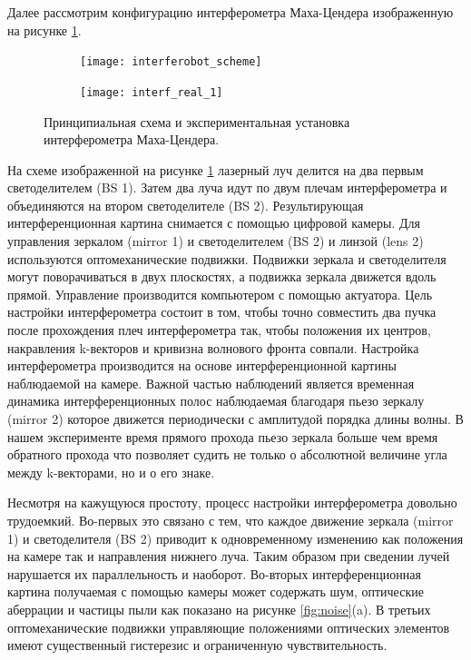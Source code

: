 Далее рассмотрим конфигурацию интерферометра Маха-Цендера изображенную на рисунке \ref{fig:interf_scheme_1}. 

\begin{figure}[ht]
    \centering
     \begin{subfigure}[b]{0.45\linewidth}
         \centering
         \texttt{[image: interferobot\_scheme]}
     \end{subfigure}
     \centering
     \begin{subfigure}[b]{0.45\linewidth}
         \centering
         \texttt{[image: interf\_real\_1]}
     \end{subfigure}
    \caption{
     Принципиальная схема и экспериментальная установка интерферометра Маха-Цендера. }
\label{fig:interf_scheme_1}
\end{figure}

На схеме изображенной на рисунке \ref{fig:interf_scheme_1} лазерный луч делится на два первым светоделителем (BS 1). Затем два луча идут по двум плечам интерферометра и объединяются на втором светоделителе (BS 2). Результирующая интерференционная картина снимается с помощью цифровой камеры. Для управления зеркалом (mirror 1) и светоделителем (BS 2) и линзой (lens 2) используются оптомеханические подвижки. Подвижки зеркала и светоделителя могут поворачиваться в двух плоскостях, а подвижка зеркала движется вдоль прямой. Управление производится компьютером с помощью актуатора. Цель настройки интерферометра состоит в том, чтобы точно совместить два пучка после прохождения плеч интерферометра так, чтобы положения их центров, накравления k-векторов и кривизна волнового фронта совпали. Настройка интерферометра производится на основе интерференционной картины наблюдаемой на камере. Важной частью наблюдений является временная динамика интерференционных полос наблюдаемая благодаря пьезо зеркалу (mirror 2) которое движется периодически с амплитудой порядка длины волны. В нашем эксперименте время прямого прохода пьезо зеркала больше чем время обратного прохода что позволяет судить не только о абсолютной величине угла между k-векторами, но и о его знаке. 

Несмотря на кажущуюся простоту, процесс настройки интерферометра довольно трудоемкий. Во-первых это связано с тем, что каждое движение зеркала  (mirror 1) и светоделителя (BS 2) приводит к одновременному изменению как положения на камере так и направления нижнего луча. Таким образом при сведении лучей нарушается их параллельность и наоборот. Во-вторых интерференционная картина получаемая с помощью камеры может содержать шум, оптические аберрации и частицы пыли как показано на рисунке \ref{fig:noise}(a). В третьих оптомеханические подвижки управляющие положениями оптических элементов имеют существенный гистерезис и ограниченную чувствительность.

